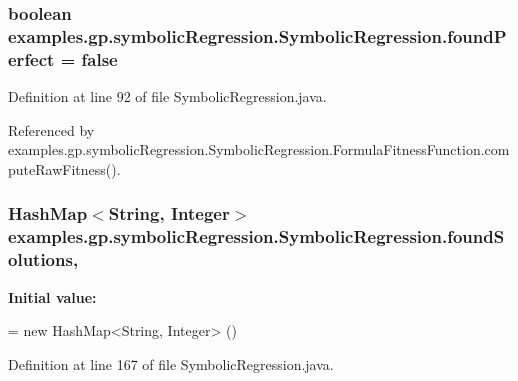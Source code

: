 \hypertarget{classexamples_1_1gp_1_1symbolic_regression_1_1_symbolic_regression_a81b11950997f88aa0fdda2e938e67772}{
\subsubsection[{found\-Perfect}]{\setlength{\rightskip}{0pt plus 5cm}boolean examples.\-gp.\-symbolic\-Regression.\-Symbolic\-Regression.\-found\-Perfect = false\hspace{0.3cm}{\ttfamily [static]}}}\label{classexamples_1_1gp_1_1symbolic_regression_1_1_symbolic_regression_a81b11950997f88aa0fdda2e938e67772}


Definition at line 92 of file Symbolic\-Regression.\-java.



Referenced by examples.\-gp.\-symbolic\-Regression.\-Symbolic\-Regression.\-Formula\-Fitness\-Function.\-compute\-Raw\-Fitness().

\hypertarget{classexamples_1_1gp_1_1symbolic_regression_1_1_symbolic_regression_ae642324f14a8d80a8856af126d3dbc91}{
\subsubsection[{found\-Solutions}]{\setlength{\rightskip}{0pt plus 5cm}Hash\-Map$<$String, Integer$>$ examples.\-gp.\-symbolic\-Regression.\-Symbolic\-Regression.\-found\-Solutions\hspace{0.3cm}{\ttfamily [static]}, {\ttfamily [private]}}}\label{classexamples_1_1gp_1_1symbolic_regression_1_1_symbolic_regression_ae642324f14a8d80a8856af126d3dbc91}
{\bfseries Initial value\-:}
\begin{DoxyCode}
= \textcolor{keyword}{new} HashMap<String,
      Integer> ()
\end{DoxyCode}


Definition at line 167 of file Symbolic\-Regression.\-java.



